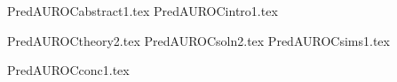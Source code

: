 \documentclass[12pt]{article}
\begin{document}






{PredAUROCabstract1.tex}
{PredAUROCintro1.tex}






{PredAUROCtheory2.tex}
{PredAUROCsoln2.tex}
{PredAUROCsims1.tex}





{PredAUROCconc1.tex}






\end{document}
